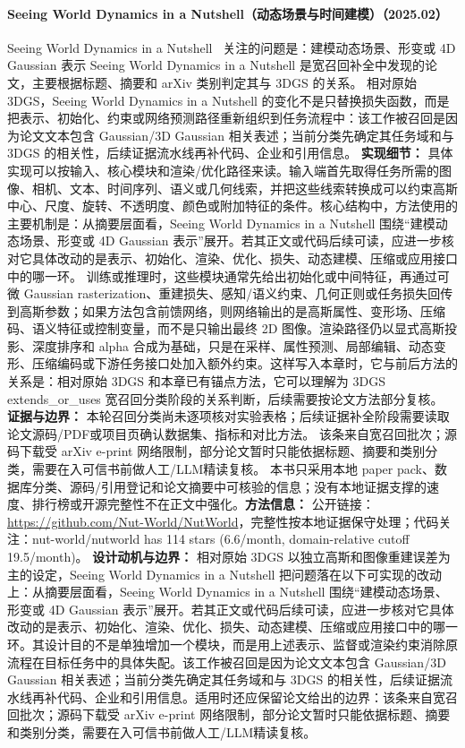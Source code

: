 \paragraph{Seeing World Dynamics in a Nutshell（动态场景与时间建模）（2025.02）}
Seeing World Dynamics in a Nutshell~\cite{2502_03465} 关注的问题是：建模动态场景、形变或 4D Gaussian 表示 Seeing World Dynamics in a Nutshell 是宽召回补全中发现的论文，主要根据标题、摘要和 arXiv 类别判定其与 3DGS 的关系。
相对原始 3DGS，Seeing World Dynamics in a Nutshell 的变化不是只替换损失函数，而是把表示、初始化、约束或网络预测路径重新组织到任务流程中：该工作被召回是因为论文文本包含 Gaussian/3D Gaussian 相关表述；当前分类先确定其任务域和与 3DGS 的相关性，后续证据流水线再补代码、企业和引用信息。
\textbf{实现细节：} 具体实现可以按输入、核心模块和渲染/优化路径来读。输入端首先取得任务所需的图像、相机、文本、时间序列、语义或几何线索，并把这些线索转换成可以约束高斯中心、尺度、旋转、不透明度、颜色或附加特征的条件。核心结构中，方法使用的主要机制是：从摘要层面看，Seeing World Dynamics in a Nutshell 围绕“建模动态场景、形变或 4D Gaussian 表示”展开。若其正文或代码后续可读，应进一步核对它具体改动的是表示、初始化、渲染、优化、损失、动态建模、压缩或应用接口中的哪一环。 训练或推理时，这些模块通常先给出初始化或中间特征，再通过可微 Gaussian rasterization、重建损失、感知/语义约束、几何正则或任务损失回传到高斯参数；如果方法包含前馈网络，则网络输出的是高斯属性、变形场、压缩码、语义特征或控制变量，而不是只输出最终 2D 图像。渲染路径仍以显式高斯投影、深度排序和 alpha 合成为基础，只是在采样、属性预测、局部编辑、动态变形、压缩编码或下游任务接口处加入额外约束。这样写入本章时，它与前后方法的关系是：相对原始 3DGS 和本章已有锚点方法，它可以理解为 3DGS extends\_or\_uses 宽召回分类阶段的关系判断，后续需要按论文方法部分复核。
\textbf{证据与边界：} 本轮召回分类尚未逐项核对实验表格；后续证据补全阶段需要读取论文源码/PDF或项目页确认数据集、指标和对比方法。 该条来自宽召回批次；源码下载受 arXiv e-print 网络限制，部分论文暂时只能依据标题、摘要和类别分类，需要在入可信书前做人工/LLM精读复核。 本书只采用本地 paper pack、数据库分类、源码/引用登记和论文摘要中可核验的信息；没有本地证据支撑的速度、排行榜或开源完整性不在正文中强化。\textbf{方法信息：} 公开链接：\url{https://github.com/Nut-World/NutWorld}，完整性按本地证据保守处理；代码关注：nut-world/nutworld has 114 stars (6.6/month, domain-relative cutoff 19.5/month)。
\textbf{设计动机与边界：} 相对原始 3DGS 以独立高斯和图像重建误差为主的设定，Seeing World Dynamics in a Nutshell 把问题落在以下可实现的改动上：从摘要层面看，Seeing World Dynamics in a Nutshell 围绕“建模动态场景、形变或 4D Gaussian 表示”展开。若其正文或代码后续可读，应进一步核对它具体改动的是表示、初始化、渲染、优化、损失、动态建模、压缩或应用接口中的哪一环。其设计目的不是单独增加一个模块，而是用上述表示、监督或渲染约束消除原流程在目标任务中的具体失配。该工作被召回是因为论文文本包含 Gaussian/3D Gaussian 相关表述；当前分类先确定其任务域和与 3DGS 的相关性，后续证据流水线再补代码、企业和引用信息。适用时还应保留论文给出的边界：该条来自宽召回批次；源码下载受 arXiv e-print 网络限制，部分论文暂时只能依据标题、摘要和类别分类，需要在入可信书前做人工/LLM精读复核。
